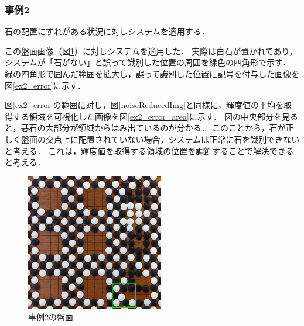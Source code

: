 \documentclass[openright]{nitocs}
\numberwithin{equation}{section}
\begin{document}
            \subsubsection{事例2} %
                石の配置にずれがある状況に対しシステムを適用する．

                この盤面画像（図\ref{ex2_img}）に対しシステムを適用した．
                実際は白石が置かれてあり，システムが「石がない」と誤って識別した位置の周囲を緑色の四角形で示す．
                緑の四角形で囲んだ範囲を拡大し，誤って識別した位置に記号を付与した画像を図\ref{ex2_error}に示す．

                図\ref{ex2_error}の範囲に対し，図\ref{noiseReducedImg}と同様に，輝度値の平均を取得する領域を可視化した画像を図\ref{ex2_error_area}に示す．
                図の中央部分を見ると，碁石の大部分が領域からはみ出ているのが分かる．
                このことから，石が正しく盤面の交点上に配置されていない場合，システムは正常に石を識別できないと考える．
                これは，輝度値を取得する領域の位置を調節することで解決できると考える．
                
                \begin{figure}[tb] %
                    \begin{center}
                    \includegraphics[clip,width=60mm]{DSC_0099/boardImg.jpg} 
                    \caption{事例2の盤面}
                    \label{ex2_img}
                    \end{center}
                \end{figure}
\end{document}
